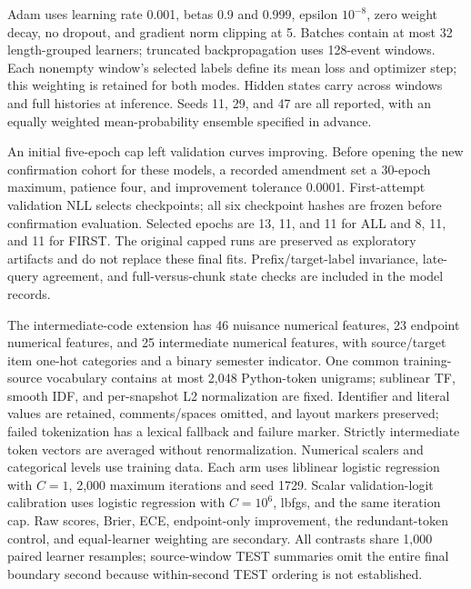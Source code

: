 \documentclass[11pt]{article}
\newcommand{\1}{\mathbb{I}}
\begin{document}
Adam uses learning rate 0.001, betas 0.9 and 0.999, epsilon $10^{-8}$, zero weight decay, no dropout, and gradient norm clipping at 5. Batches contain at most 32 length-grouped learners; truncated backpropagation uses 128-event windows. Each nonempty window's selected labels define its mean loss and optimizer step; this weighting is retained for both modes. Hidden states carry across windows and full histories at inference. Seeds 11, 29, and 47 are all reported, with an equally weighted mean-probability ensemble specified in advance.

An initial five-epoch cap left validation curves improving. Before opening the new confirmation cohort for these models, a recorded amendment set a 30-epoch maximum, patience four, and improvement tolerance 0.0001. First-attempt validation NLL selects checkpoints; all six checkpoint hashes are frozen before confirmation evaluation. Selected epochs are 13, 11, and 11 for ALL and 8, 11, and 11 for FIRST. The original capped runs are preserved as exploratory artifacts and do not replace these final fits. Prefix/target-label invariance, late-query agreement, and full-versus-chunk state checks are included in the model records.

The intermediate-code extension has 46 nuisance numerical features, 23 endpoint numerical features, and 25 intermediate numerical features, with source/target item one-hot categories and a binary semester indicator. One common training-source vocabulary contains at most 2,048 Python-token unigrams; sublinear TF, smooth IDF, and per-snapshot L2 normalization are fixed. Identifier and literal values are retained, comments/spaces omitted, and layout markers preserved; failed tokenization has a lexical fallback and failure marker. Strictly intermediate token vectors are averaged without renormalization. Numerical scalers and categorical levels use training data. Each arm uses liblinear logistic regression with $C=1$, 2,000 maximum iterations and seed 1729. Scalar validation-logit calibration uses logistic regression with $C=10^6$, lbfgs, and the same iteration cap. Raw scores, Brier, ECE, endpoint-only improvement, the redundant-token control, and equal-learner weighting are secondary. All contrasts share 1,000 paired learner resamples; source-window TEST summaries omit the entire final boundary second because within-second TEST ordering is not established.
\end{document}

